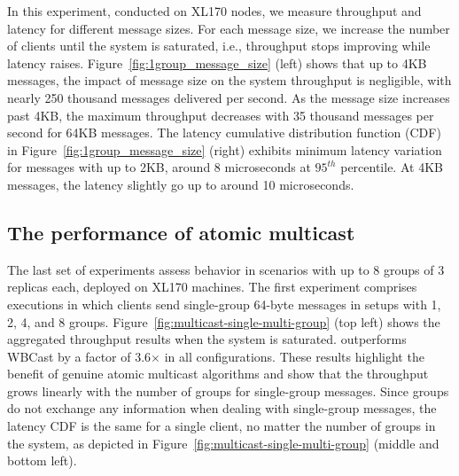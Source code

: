In this experiment, conducted on XL170 nodes, we measure \libname throughput and latency for different message sizes.
For each message size, we increase the number of clients until the system is saturated, i.e., throughput stops improving while latency raises.
Figure~\ref{fig:1group_message_size} (left) shows that up to 4KB messages, the impact of message size on the system throughput is negligible, with nearly 250 thousand messages delivered per second. 
As the message size increases past 4KB, the maximum throughput decreases with 35 thousand messages per second for 64KB messages.
The latency cumulative distribution function (CDF) in Figure~\ref{fig:1group_message_size} (right) exhibits minimum latency variation for messages with up to 2KB, around 8 microseconds at $95^{th}$ percentile. At 4KB messages, the latency slightly go up to around 10 microseconds.


\subsection{The performance of atomic multicast}
\label{sec:evaluation:multicast}

The last set of experiments assess \libname behavior in scenarios with up to 8 groups of 3 replicas each, deployed on XL170 machines.
The first experiment comprises executions in which clients send single-group 64-byte messages in setups with 1, 2, 4, and 8 groups.
Figure~\ref{fig:multicast-single-multi-group} (top left) shows the aggregated throughput results when the system is saturated. 
\libname outperforms WBCast by a factor of 3.6$\times$ in all configurations.
These results highlight the benefit of genuine atomic multicast algorithms and show that the throughput grows linearly with the number of groups for single-group messages. 
Since groups do not exchange any information when dealing with single-group messages, the latency CDF is the same for a single client, no matter the number of groups in the system, as depicted in Figure~\ref{fig:multicast-single-multi-group} (middle and bottom left).


